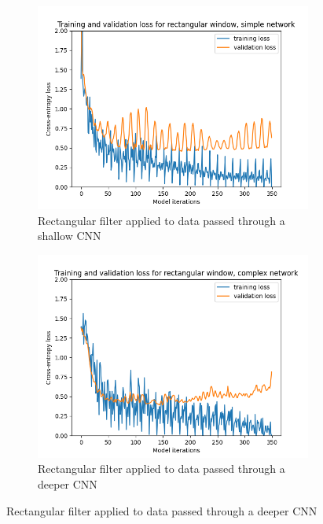 \begin{figure}[hbt!]
    \begin{subfigure}[b]{0.5\textwidth}
        \includegraphics[width=\linewidth]{Images/rectangularSimple.png}
        \caption{Rectangular filter applied to data passed through a shallow CNN}
        \label{fig:RectShallow}
    \end{subfigure}
    \hfill
    \begin{subfigure}[b]{0.5\textwidth}
        \includegraphics[width=\linewidth]{Images/rectangularComplex.png}
        \caption{Rectangular filter applied to data passed through a deeper CNN}
        \label{fig:RectDeeper}
    \end{subfigure}
    \hfill

\end{figure}
